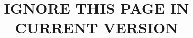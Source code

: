 \documentclass[]{article}
\title{IGNORE THIS PAGE IN CURRENT VERSION}
\newcommand{\listoftodos}[2][]{}
\begin{document}
\listoftodos

\doublespacing
















\end{document}
